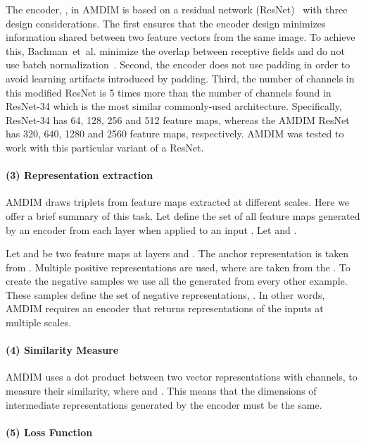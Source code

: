 \documentclass{article}
\begin{document}
The encoder, , in AMDIM is based on a residual network (ResNet)~\cite{he2016deep} with three design considerations. The first ensures that the encoder design minimizes information shared between two feature vectors from the same image. To achieve this, Bachman~et~al. minimize the overlap between receptive fields and do not use batch normalization~\cite{ioffe2015batch}. Second, the encoder does not use padding in order to avoid learning artifacts introduced by padding. Third, the number of channels in this modified ResNet is 5 times more than the number of channels found in ResNet-34 which is the most similar commonly-used architecture. Specifically, ResNet-34 has 64, 128, 256 and 512 feature maps, whereas the AMDIM ResNet has 320, 640, 1280 and 2560 feature maps, respectively. AMDIM was tested to work with this particular variant of a ResNet.

\paragraph{(3) Representation extraction}

AMDIM draws  triplets from feature maps extracted at different scales. Here we offer a brief summary of this task. Let  define the set of all feature maps generated by an encoder from each layer  when applied to an input . Let  and . 

Let  and  be two feature maps at layers  and . The anchor representation  is taken from . Multiple positive representations  are used, where  are taken from the . To create the negative samples we use all the  generated from every other example. These samples define the set of negative representations, . In other words, AMDIM requires an encoder that returns representations of the inputs at multiple scales.

\paragraph{(4) Similarity Measure}

AMDIM uses a dot product between two vector representations with  channels,  to measure their similarity, where  and . This means that the dimensions of intermediate representations generated by the encoder must be the same.

\paragraph{(5) Loss Function}
\end{document}
